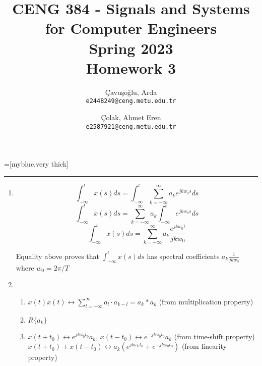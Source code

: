 \documentclass[10pt,a4paper, margin=1in]{article}
\author{
  Çavuşoğlu, Arda\\
  \texttt{e2448249@ceng.metu.edu.tr}
  \and
  Çolak, Ahmet Eren\\
  \texttt{e2587921@ceng.metu.edu.tr}
}
\title{CENG 384 - Signals and Systems for Computer Engineers \\
Spring 2023 \\
Homework 3}
\begin{document}
\maketitle

=[myblue,very thick]
\def\tick#1#2{\draw[thick] (#1) ++ (#2:0.1) --++ (#2-180:0.2)}

\noindent\rule{19cm}{1.2pt}

\begin{enumerate}

\item %
    \begin{equation*}
        \int_{-\infty}^{t}x(s)ds = \int_{-\infty}^{t} \sum_{k=-\infty}^{\infty} a_k e^{jkw_0s}ds
    \end{equation*}
    \begin{equation*}
        \int_{-\infty}^{t}x(s)ds = \sum_{k=-\infty}^{\infty}a_k\int_{-\infty}^{t}  e^{jkw_0s}ds
    \end{equation*}
    \begin{equation*}
        \int_{-\infty}^{t}x(s)ds = \sum_{k=-\infty}^{\infty}a_k\frac{e^{jkw_0t}}{jkw_0}
    \end{equation*}

    Equality above proves that $\int_{-\infty}^{t}x(s)ds$ has spectral coefficients $a_k\frac{1}{jkw_0}$ where $w_0 = 2\pi/T$
\item %
	\begin{enumerate}
    \item %
    $x(t)x(t) \longleftrightarrow \sum^{\infty}_{l=-\infty}a_l\cdot a_{k-l} = a_k * a_k$ (from multiplication property)
    
    \item %
    $R\{a_k\}$
    
    \item %
    $x(t+t_0) \longleftrightarrow e^{jk\omega_0t_0}a_k$, $x(t-t_0) \longleftrightarrow e^{-jk\omega_0t_0}a_k$ (from time-shift property) \\
    $x(t+t_0) + x(t-t_0) \longleftrightarrow a_k(e^{jk\omega_0t_0} + e^{-jk\omega_0t_0})$ (from linearity property) \vspace{0.5cm}\\
    \end{enumerate}


\end{enumerate}
\end{document}
